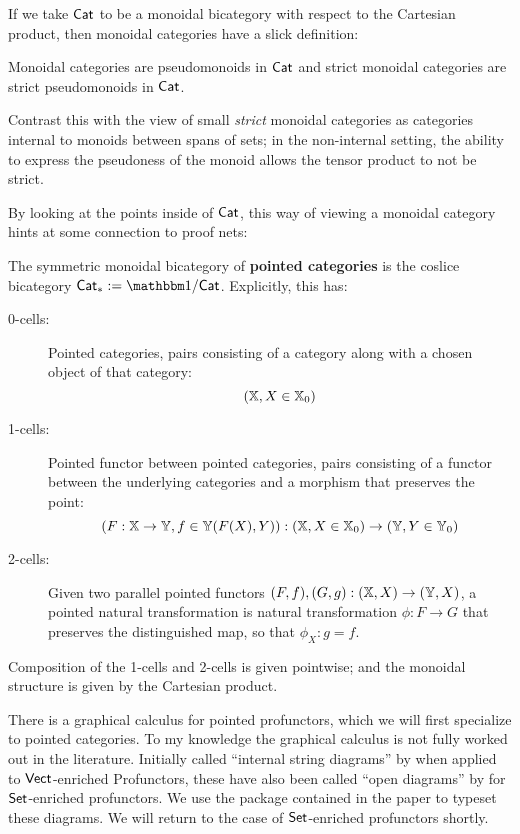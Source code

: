 If we take ${\sf Cat}$ to be a monoidal bicategory with respect to the Cartesian product, then monoidal categories have a slick definition:
\begin{lemma}
Monoidal categories are pseudomonoids in ${\sf Cat}$ and strict monoidal categories are strict pseudomonoids in ${\sf Cat}$.
\end{lemma}
Contrast this with the view of small {\em strict} monoidal categories as categories internal to monoids between spans of sets; in the non-internal setting, the ability to express the pseudoness of the monoid allows the tensor product to not be strict.

By looking at the points inside of ${\sf Cat}$, this way of viewing a monoidal category hints at some connection to proof nets:
\begin{definition}
The symmetric monoidal bicategory of {\bf pointed categories} is the coslice bicategory $\Cat_*:=\one/\Cat$.  Explicitly, this has:
\begin{description}
\item[0-cells:] Pointed categories, pairs consisting of a category along with a chosen object of that category: 
$$(\mathbb{X}, X\in\mathbb{X}_0)$$
\item[1-cells:] Pointed functor between pointed categories,   pairs consisting of a functor between the underlying categories and a morphism that preserves the point:
$$(F:\mathbb{X}\to\mathbb{Y}, f\in \mathbb{Y}(F(X),Y) ):(\mathbb{X}, X\in\mathbb{X}_0)\to (\mathbb{Y}, Y\in\mathbb{Y}_0)$$
\item[2-cells:] Given two parallel pointed functors $(F,f),  (G,g):(\mathbb{X},X)\to (\mathbb{Y},X)$,
a pointed natural transformation is natural transformation  $\phi:F\to G$ that preserves the distinguished map, so that $\phi_X:g=f$.
\end{description}
Composition of the 1-cells and 2-cells is given pointwise; and the monoidal structure is given by the Cartesian product.
\end{definition}
There is a graphical calculus for pointed profunctors, which we will first specialize to pointed categories.  To my knowledge the graphical calculus is not fully worked out in the literature.  Initially called ``internal string diagrams''  by \cite{vicary} when applied to  $\mathsf{Vect}$-enriched Profunctors, these have also been called ``open diagrams'' by \cite{mario} for $\mathsf{Set}$-enriched profunctors. We use the package contained in the paper \cite{vicary} to typeset these diagrams.  We will return to the case of $\mathsf{Set}$-enriched profunctors shortly.

